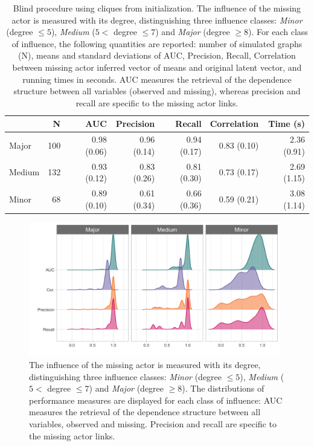 \begin{table}[b!]
\centering
\begin{tabular}{lrrrrrr}
  \hline
  & N & AUC & Precision & Recall & Correlation & Time (s) \\ 
  \hline
 Major & 100 & 0.98 (0.06) & 0.96 (0.14) & 0.94 (0.17) & 0.83 (0.10)& 2.36 (0.91)  \\ 
 Medium & 132 & 0.93 (0.12) & 0.83 (0.26) & 0.81 (0.30) & 0.73 (0.17)& 2.69 (1.15)  \\ 
 Minor &  68 & 0.89 (0.10) & 0.61 (0.34) & 0.66 (0.36) & 0.59 (0.21) & 3.08 (1.14) \\ 
   \hline
\end{tabular}
\caption{\label{tab:perf}Blind procedure using cliques from initialization. The influence of the missing actor is measured with its degree, distinguishing three influence classes: \textit{Minor} (degree $\leq 5$), \textit{Medium} ($5<$ degree $\leq 7$) and \textit{Major} (degree $\geq 8$).  For each class of influence, the following quantities are reported:  number of simulated graphs (N), means and standard deviations of AUC, Precision, Recall, Correlation between missing actor inferred vector of means and original latent vector, and running times in seconds. AUC measures the retrieval of the dependence structure between all variables (observed and missing), whereas precision and recall are specific to the missing actor links.} 

\end{table}
 
\begin{figure}
    \centering
    \includegraphics[width=11cm]{figs/simu_densities.png}
    \caption{
    The influence of the missing actor is measured with its degree, distinguishing three influence classes: \textit{Minor} (degree $\leq 5$), \textit{Medium} ($5<$ degree $\leq 7$) and \textit{Major} (degree $\geq 8$). 
    The distributions of performance measures are displayed for each class of influence: AUC measures the retrieval of the dependence structure between all variables, observed and missing.  Precision and recall are specific to the missing actor links. 
    }
    \label{fig:densities}
\end{figure}
 

